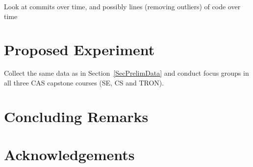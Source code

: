 \documentclass[10pt, conference]{IEEEtran}
\begin{document}
Look at commits over time, and possibly lines (removing outliers) of code over
time

\section{Proposed Experiment} \label{SecProposedExperiment}

Collect the same data as in Section~\ref{SecPrelimData} and conduct focus groups
in all three CAS capstone courses (SE, CS and TRON).

\section{Concluding Remarks} \label{SecConclusions}

\section*{Acknowledgements}



\end{document}
